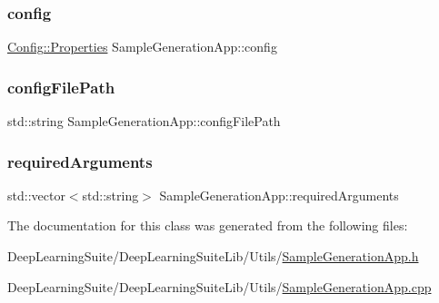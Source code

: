 \subsubsection{\texorpdfstring{config}{config}}
{\footnotesize\ttfamily \hyperlink{class_config_1_1_properties}{Config\+::\+Properties} Sample\+Generation\+App\+::config\hspace{0.3cm}{\ttfamily [protected]}}

\mbox{\label{class_sample_generation_app_ad40fd006cd4f887a6458054152bf3592}} 
\subsubsection{\texorpdfstring{config\+File\+Path}{configFilePath}}
{\footnotesize\ttfamily std\+::string Sample\+Generation\+App\+::config\+File\+Path\hspace{0.3cm}{\ttfamily [protected]}}

\mbox{\label{class_sample_generation_app_a1dae733636d90e8b5d27002cf513e59a}} 
\subsubsection{\texorpdfstring{required\+Arguments}{requiredArguments}}
{\footnotesize\ttfamily std\+::vector$<$std\+::string$>$ Sample\+Generation\+App\+::required\+Arguments\hspace{0.3cm}{\ttfamily [protected]}}



The documentation for this class was generated from the following files\+:\begin{DoxyCompactItemize}
\item 
Deep\+Learning\+Suite/\+Deep\+Learning\+Suite\+Lib/\+Utils/\hyperlink{_sample_generation_app_8h}{Sample\+Generation\+App.\+h}\item 
Deep\+Learning\+Suite/\+Deep\+Learning\+Suite\+Lib/\+Utils/\hyperlink{_sample_generation_app_8cpp}{Sample\+Generation\+App.\+cpp}\end{DoxyCompactItemize}
